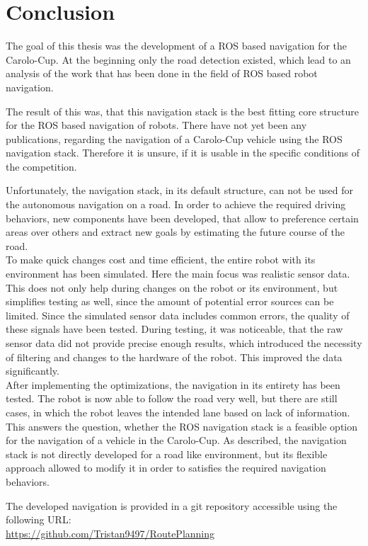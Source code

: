 \chapter{Conclusion}
\label{Conclusion}
The goal of this thesis was the development of a ROS based navigation for the Carolo-Cup. At the beginning only the road detection existed, which lead to an analysis of the work that has been done in the field of ROS based robot navigation.

The result of this was, that this navigation stack is the best fitting core structure for the ROS based navigation of robots. There have not yet been any publications, regarding the navigation of a Carolo-Cup vehicle using the ROS navigation stack. Therefore it is unsure, if it is usable in the specific conditions of the competition.

Unfortunately, the navigation stack, in its default structure, can not be used for the autonomous navigation on a road. In order to achieve the required driving behaviors, new components have been developed, that allow to preference certain areas over others and extract new goals by estimating the future course of the road.\\

To make quick changes cost and time efficient, the entire robot with its environment has been simulated. Here the main focus was realistic sensor data. This does not only help during changes on the robot or its environment, but simplifies testing as well, since the amount of potential error sources can be limited. Since the simulated sensor data includes common errors, the quality of these signals have been tested.
During testing, it was noticeable, that the raw sensor data did not provide precise enough results, which introduced the necessity of filtering and changes to the hardware of the robot. This improved the data significantly.\\

After implementing the optimizations, the navigation in its entirety has been tested. The robot is now able to follow the road very well, but there are still cases, in which the robot leaves the intended lane based on lack of information.\\

This answers the question, whether the ROS navigation stack is a feasible option for the navigation of a vehicle in the Carolo-Cup. 
As described, the navigation stack is not directly developed for a road like environment, but its flexible approach allowed to modify it in order to satisfies the required navigation behaviors.

The developed navigation is provided in a git repository accessible using the following URL:\\
\url{https://github.com/Tristan9497/RoutePlanning}\\
